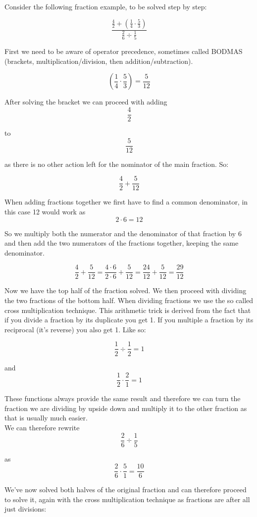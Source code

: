 \documentclass[12pt,a4paper]{article}
\theoremstyle{regla}
\theoremstyle{remark}
\theoremstyle{definition}
\theoremstyle{nonumberbreak}
\begin{document}
\begin{xmpl}

Consider the following fraction example, to be solved step by step: 

$$\frac{\frac{4}{2}+(\frac{1}{4}\cdot\frac{5}{3})}{\frac{2}{6}\div\frac{1}{5}}$$

First we need to be aware of operator precedence, sometimes called BODMAS (brackets, multiplication/division, then addition/subtraction). 

$$(\frac{1}{4}\cdot\frac{5}{3}) = \frac{5}{12}$$

After solving the bracket we can proceed with adding $$\frac{4}{2}$$

to $$\frac{5}{12}$$

as there is no other action left for the nominator of the main fraction. So:

$$\frac{4}{2}+\frac{5}{12}$$

When adding fractions together we first have to find a common denominator, in this case 12 would work as $$2\cdot6=12$$

So we multiply both the numerator and the denominator of that fraction by 6 and then add the two numerators of the fractions together, keeping the same denominator. 
 
$$\frac{4}{2}+\frac{5}{12}=\frac{4\cdot6}{2\cdot6}+\frac{5}{12}=\frac{24}{12}+\frac{5}{12}=\frac{29}{12}$$

Now we have the top half of the fraction solved. We then proceed with dividing the two fractions of the bottom half. When dividing fractions we use the so called cross multiplication technique. This arithmetic trick is derived from the fact that if you divide a fraction by its duplicate you get 1. If you multiple a fraction by its reciprocal (it's reverse) you also get 1. Like so:

$$\frac{1}{2}\div\frac{1}{2}=1$$

and $$\frac{1}{2}\cdot\frac{2}{1}=1$$

These functions always provide the same result and therefore we can turn the fraction we are dividing by upside down and multiply it to the other fraction as that is usually much easier.\\

We can therefore rewrite $$\frac{2}{6}\div\frac{1}{5}$$

as $$\frac{2}{6}\cdot\frac{5}{1}=\frac{10}{6}$$

We've now solved both halves of the original fraction and can therefore proceed to solve it, again with the cross multiplication technique as fractions are after all just divisions:


\end{xmpl}
\end{document}
